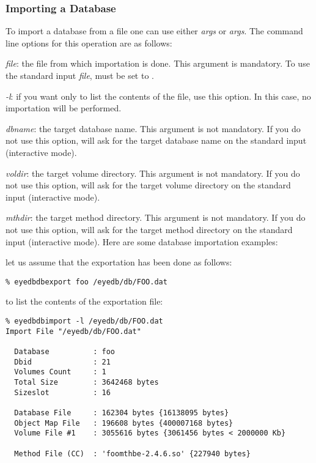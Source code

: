 \subsubsection{Importing a Database}
To import a database from a file one can use either  \emph{args}
or  \emph{args}.
The command line options for this operation are as follows:
\bi
\item \emph{file}: the file from which importation is done.
This argument is mandatory. To use the standard input \emph{file}, must be
set to \ttv{-}.
\item \emph{-l}: if you want only to list the contents of the file, use
this option. In this case, no importation will be performed.
\item {} \emph{dbname}: the target database name.
This argument is not mandatory.
If you do not use this option,  will ask for 
the target database name on the standard input (interactive mode).
\item {} \emph{voldir}: the target volume directory.
This argument is not mandatory.
If you do not use this option,  will ask for 
the target volume directory on the standard input (interactive mode).
\item {} \emph{mthdir}: the target method directory.
This argument is not mandatory.
If you do not use this option,  will ask for 
the target method directory on the standard input (interactive mode).
\ei
Here are some database importation examples:
\bi
\item let us assume that the exportation has been done as follows:
\verbsize
\begin{verbatim}
% eyedbdbexport foo /eyedb/db/FOO.dat
\end{verbatim}
\normalsize
\item to list the contents of the exportation file:
\verbsize
\begin{verbatim}
% eyedbdbimport -l /eyedb/db/FOO.dat
Import File "/eyedb/db/FOO.dat"
 
  Database          : foo
  Dbid              : 21
  Volumes Count     : 1
  Total Size        : 3642468 bytes
  Sizeslot          : 16
 
  Database File     : 162304 bytes {16138095 bytes}
  Object Map File   : 196608 bytes {400007168 bytes}
  Volume File #1    : 3055616 bytes {3061456 bytes < 2000000 Kb}
 
  Method File (CC)  : 'foomthbe-2.4.6.so' {227940 bytes}
\end{verbatim}
